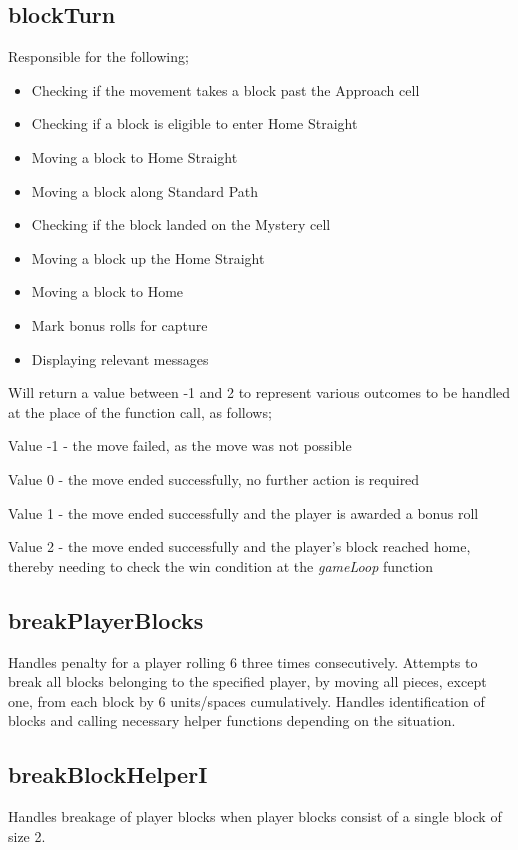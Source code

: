 \documentclass{article}
\begin{document}
\subsection{blockTurn}
Responsible for the following;
\begin{itemize}
    \item Checking if the movement takes a block past the Approach cell
    \item Checking if a block is eligible to enter Home Straight
    \item Moving a block to Home Straight
    \item Moving a block along Standard Path
    \item Checking if the block landed on the Mystery cell
    \item Moving a block up the Home Straight
    \item Moving a block to Home
    \item Mark bonus rolls for capture
    \item Displaying relevant messages
\end{itemize}

Will return a value between -1 and 2 to represent various outcomes to be handled at the place of the function call, as follows;

Value -1 - the move failed, as the move was not possible

Value 0 - the move ended successfully, no further action is required

Value 1 - the move ended successfully and the player is awarded a bonus roll

Value 2 - the move ended successfully and the player's block reached home, thereby needing to check the win condition at the \textit{gameLoop} function

\subsection{breakPlayerBlocks}
Handles penalty for a player rolling 6 three times consecutively. Attempts to break all blocks belonging to the specified player, by moving all pieces, except one, from each block by 6 units/spaces cumulatively.
Handles identification of blocks and calling necessary helper functions depending on the situation. 

\subsection{breakBlockHelperI}
Handles breakage of player blocks when player blocks consist of a single block of size 2.
\end{document}
